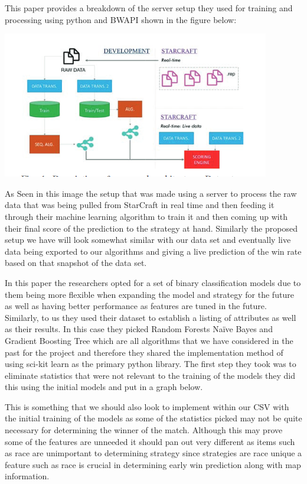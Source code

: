 \documentclass[a4paper,12pt]{report}
\begin{document}
This paper provides a breakdown of the server setup they used for training and processing using python and BWAPI shown in the figure below:

\begin{center}
    \captionsetup{type=figure}
    \includegraphics[width=.9\linewidth]{media/TestingServerCycle.png}
\end{center}

As Seen in this image the setup that was made using a server to process the raw data that was being pulled from StarCraft in real time and then feeding it through their machine learning algorithm to train it and then coming up with their final score of the prediction to the strategy at hand. Similarly the proposed setup we have will look somewhat similar with our data set and eventually live data being exported to our algorithms and giving a live prediction of the win rate based on that snapshot of the data set.

In this paper the researchers opted for a set of binary classification models due to them being more flexible when expanding the model and strategy for the future as well as having better performance as features are tuned in the future. Similarly, to us they used their dataset to establish a listing of attributes as well as their results. In this case they picked Random Forests Naïve Bayes and Gradient Boosting Tree which are all algorithms that we have considered in the past for the project and therefore they shared the implementation method of using sci-kit learn as the primary python library. The first step they took was to eliminate statistics that were not relevant to the training of the models they did this using the initial models and put in a graph below.

This is something that we should also look to implement within our CSV with the initial training of the models as some of the statistics picked may not be quite necessary for determining the winner of the match. Although this may prove some of the features are unneeded it should pan out very different as items such as race are unimportant to determining strategy since strategies are race unique a feature such as race is crucial in determining early win prediction along with map information.
\end{document}
